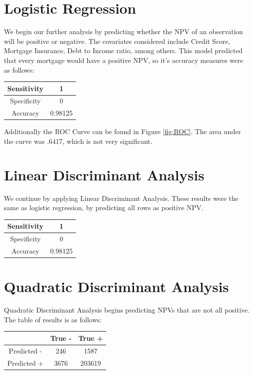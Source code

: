 \documentclass[10pt,twocolumn,letterpaper]{article}
\begin{document}
\section{Logistic Regression}
We begin our further analysis by predicting whether the NPV of an observation will be positive or negative. The covariates considered include Credit Score, Mortgage Insurance, Debt to Income ratio, among others. This model predicted that every mortgage would have a positive NPV, so it's accuracy measures were as follows:
\begin{center}
	\begin{tabular}{ |c|c| } 
		\hline
		Sensitivity & 1 \\ 
		\hline
		Specificity & 0 \\
		\hline
		Accuracy & 0.98125\\ 
		\hline
	\end{tabular}
\end{center}

Additionally the ROC Curve can be found in Figure \ref{fig:ROC}. The area under the curve was .6417, which is not very significant.

\section{Linear Discriminant Analysis}

We continue by applying Linear Discriminant Analysis. These results were the same as logistic regression, by predicting all rows as positive NPV. 
\begin{center}
	\begin{tabular}{ |c|c| } 
		\hline
		Sensitivity & 1 \\ 
		\hline
		Specificity & 0 \\
		\hline
		Accuracy & 0.98125\\ 
		\hline
	\end{tabular}
\end{center}

\section{Quadratic Discriminant Analysis}

Quadratic Discriminant Analysis begins predicting NPVs that are not all positive. The table of results is as follows:

\begin{center}
	\begin{tabular}{ |c|c|c| } 
		\hline
		& True - & True +\\ 
		\hline
		Predicted - & 246 & 1587 \\ 
		\hline
		Predicted + & 3676 & 203619\\
		\hline
	\end{tabular}
\end{center}
\end{document}
